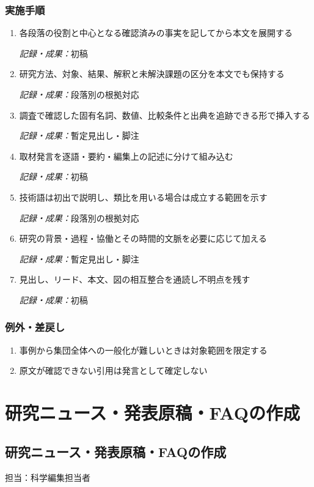 \documentclass[a4paper,11pt]{article}
\begin{document}
\subsubsection*{実施手順}
\begin{enumerate}[leftmargin=2em,itemsep=0.65em]
\item 各段落の役割と中心となる確認済みの事実を記してから本文を展開する\par\noindent\textit{記録・成果：}初稿\nobreak\smallskip
\item 研究方法、対象、結果、解釈と未解決課題の区分を本文でも保持する\par\noindent\textit{記録・成果：}段落別の根拠対応\nobreak\smallskip
\item 調査で確認した固有名詞、数値、比較条件と出典を追跡できる形で挿入する\par\noindent\textit{記録・成果：}暫定見出し・脚注\nobreak\smallskip
\item 取材発言を逐語・要約・編集上の記述に分けて組み込む\par\noindent\textit{記録・成果：}初稿\nobreak\smallskip
\item 技術語は初出で説明し、類比を用いる場合は成立する範囲を示す\par\noindent\textit{記録・成果：}段落別の根拠対応\nobreak\smallskip
\item 研究の背景・過程・協働とその時間的文脈を必要に応じて加える\par\noindent\textit{記録・成果：}暫定見出し・脚注\nobreak\smallskip
\item 見出し、リード、本文、図の相互整合を通読し不明点を残す\par\noindent\textit{記録・成果：}初稿\nobreak\smallskip
\end{enumerate}
\subsubsection*{例外・差戻し}
\begin{enumerate}[leftmargin=2em,itemsep=0.35em]
\item 事例から集団全体への一般化が難しいときは対象範囲を限定する
\item 原文が確認できない引用は発言として確定しない
\end{enumerate}
\section{研究ニュース・発表原稿・FAQの作成}
\subsection{研究ニュース・発表原稿・FAQの作成}
\par 担当：科学編集担当者\par\medskip
\end{document}

